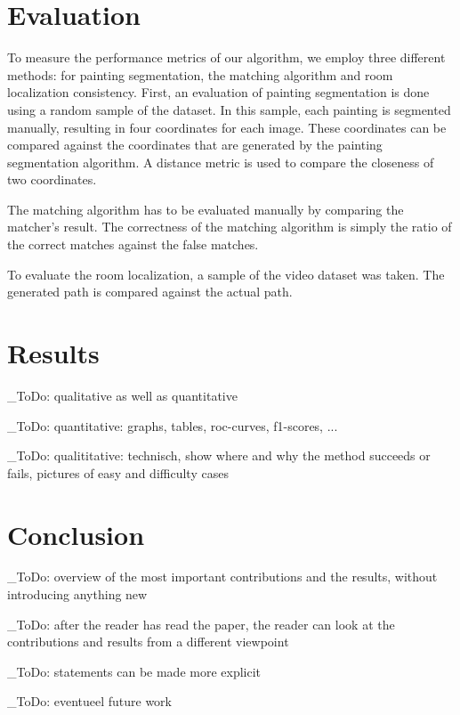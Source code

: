 \documentclass[10pt,final,journal]{IEEEtran}
\newcommand{\todo}[1]{\color{red}\_ToDo: #1 \color{black}}
\begin{document}
	
	\section{Evaluation}
	To measure the performance metrics of our algorithm, we employ three different methods: for painting segmentation, the matching algorithm and room localization consistency. First, an evaluation of painting segmentation is done using a random sample of the dataset. In this sample, each painting is segmented manually, resulting in four coordinates for each image. These coordinates can be compared against the coordinates that are generated by the painting segmentation algorithm. A distance metric is used to compare the closeness of two coordinates.
	
	The matching algorithm has to be evaluated manually by comparing the matcher's result. The correctness of the matching algorithm is simply the ratio of the correct matches against the false matches.
	
	To evaluate the room localization, a sample of the video dataset was taken. The generated path is compared against the actual path.
	
	
	
	
	
	
	\section{Results}
	\todo{qualitative as well as quantitative}
	
	\todo{quantitative: graphs, tables, roc-curves, f1-scores, ...}
	
	\todo{qualititative: technisch, show where and why the method succeeds or fails, pictures of easy and difficulty cases}
	
	\section{Conclusion}
	\todo{overview of the most important contributions and the results, without introducing anything new}
	
	\todo{after the reader has read the paper, the reader can look at the contributions and results from a different viewpoint}
	
	\todo{statements can be made more explicit}
	
	\todo{eventueel future work}

	
	
\end{document}
